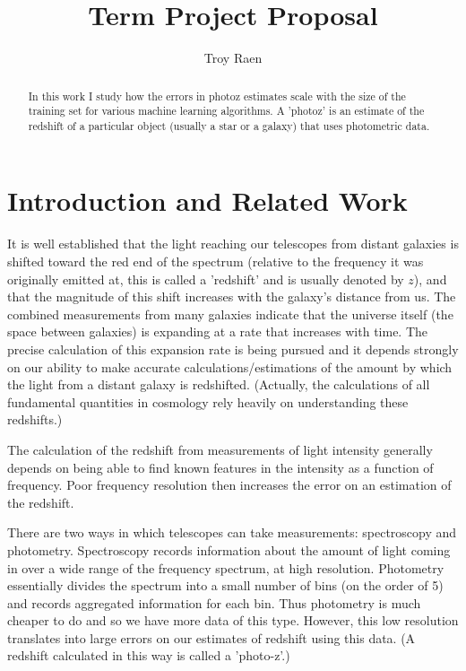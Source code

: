 \documentclass[13pt]{amsart}
\title{Term Project Proposal}
\author{Troy Raen}
\begin{document}
\maketitle



\begin{abstract}
  In this work I study how the errors in photoz estimates scale with the size of the training set for various machine learning algorithms. A 'photoz' is an estimate of the redshift of a particular object (usually a star or a galaxy) that uses photometric data.
\end{abstract}


\section{Introduction and Related Work}

  It is well established that the light reaching our telescopes from distant galaxies is shifted toward the red end of the spectrum (relative to the frequency it was originally emitted at, this is called a 'redshift' and is usually denoted by $z$), and that the magnitude of this shift increases with the galaxy's distance from us. The combined measurements from many galaxies indicate that the universe itself (the space between galaxies) is expanding at a rate that increases with time. The precise calculation of this expansion rate is being pursued and it depends strongly on our ability to make accurate calculations/estimations of the amount by which the light from a distant galaxy is redshifted. (Actually, the calculations of all fundamental quantities in cosmology rely heavily on understanding these redshifts.)

  The calculation of the redshift from measurements of light intensity generally depends on being able to find known features in the intensity as a function of frequency. Poor frequency resolution then increases the error on an estimation of the redshift.

  There are two ways in which telescopes can take measurements: spectroscopy and photometry. Spectroscopy records information about the amount of light coming in over a wide range of the frequency spectrum, at high resolution. Photometry essentially divides the spectrum into a small number of bins (on the order of 5) and records aggregated information for each bin. Thus photometry is much cheaper to do and so we have more data of this type. However, this low resolution translates into large errors on our estimates of redshift using this data. (A redshift calculated in this way is called a 'photo-z'.)
\end{document}
